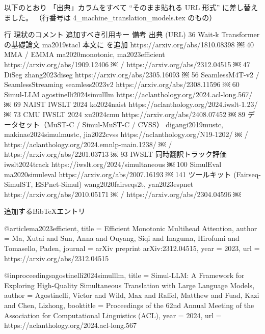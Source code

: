 

以下のとおり 「出典」カラムをすべて “そのまま貼れる URL 形式” に差し替えました。
（行番号は 4_machine_translation_models.tex のもの）

行	現状のコメント	追加すべき引用キー	備考	出典 (URL)
36	Wait-k Transformer の基礎論文	ma2019stacl	本文に \cite{ma2019stacl} を追加	https://arxiv.org/abs/1810.08398  ￼
40	MMA / EMMA	ma2020monotonic, ma2023efficient	\cite{ma2020monotonic,ma2023efficient}	https://arxiv.org/abs/1909.12406  ￼ / https://arxiv.org/abs/2312.04515  ￼
47	DiSeg	zhang2023diseg	\cite{zhang2023diseg}	https://arxiv.org/abs/2305.16093  ￼
56	SeamlessM4T-v2 / SeamlessStreaming	seamless2023v2	\cite{seamless2023v2}	https://arxiv.org/abs/2308.11596  ￼
60	Simul-LLM	agostinelli2024simulllm	\cite{agostinelli2024simulllm}	https://aclanthology.org/2024.acl-long.567/  ￼
69	NAIST IWSLT 2024	ko2024naist	\cite{ko2024naist}	https://aclanthology.org/2024.iwslt-1.23/  ￼
73	CMU IWSLT 2024	xu2024cmu	\cite{xu2024cmu}	https://arxiv.org/abs/2408.07452  ￼
89	データセット（MuST-C / Simul-MuST-C / CVSS）	digangi2019mustc, makinae2024simulmustc, jia2022cvss	\cite{digangi2019mustc,makinae2024simulmustc,jia2022cvss}	https://aclanthology.org/N19-1202/  ￼ / https://aclanthology.org/2024.emnlp-main.1238/  ￼ / https://arxiv.org/abs/2201.03713  ￼
93	IWSLT 同時翻訳トラック評価	iwslt2024track	\cite{iwslt2024track}	https://iwslt.org/2024/simultaneous  ￼
100	SimulEval	ma2020simuleval	\cite{ma2020simuleval}	https://arxiv.org/abs/2007.16193  ￼
141	ツールキット (Fairseq-SimulST, ESPnet-Simul)	wang2020fairseqs2t, yan2023espnet	\cite{wang2020fairseqs2t,yan2023espnet}	https://arxiv.org/abs/2010.05171  ￼ / https://arxiv.org/abs/2304.04596  ￼


追加するBibTeXエントリ

@article{ma2023efficient,
  title     = {Efficient Monotonic Multihead Attention},
  author    = {Ma, Xutai and Sun, Anna and Ouyang, Siqi and Inaguma, Hirofumi and Tomasello, Paden},
  journal   = {arXiv preprint arXiv:2312.04515},
  year      = {2023},
  url       = {https://arxiv.org/abs/2312.04515}
}

@inproceedings{agostinelli2024simulllm,
  title     = {Simul-{LLM}: A Framework for Exploring High-Quality Simultaneous Translation with Large Language Models},
  author    = {Agostinelli, Victor and Wild, Max and Raffel, Matthew and Fuad, Kazi and Chen, Lizhong},
  booktitle = {Proceedings of the 62nd Annual Meeting of the Association for Computational Linguistics (ACL)},
  year      = {2024},
  url       = {https://aclanthology.org/2024.acl-long.567}
}


